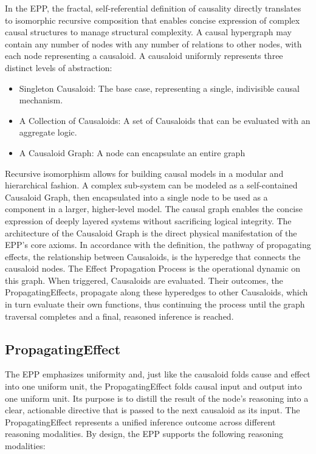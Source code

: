 In the EPP, the fractal, self-referential definition of causality directly translates 
to isomorphic recursive composition that enables concise expression of complex causal structures to manage structural complexity. A causal hypergraph may contain any number of nodes with any number of relations to other nodes, with each node representing a causaloid. A causaloid uniformly represents three distinct levels of abstraction:

\begin{itemize}
 	\item Singleton Causaloid: The base case, representing a single, indivisible causal mechanism.
 	\item A Collection of Causaloids: A set of Causaloids that can be evaluated with an aggregate logic. 
 	\item A Causaloid Graph: A node can encapsulate an entire graph
\end{itemize}

Recursive isomorphism allows for building causal models in a modular and hierarchical fashion. 
A complex sub-system can be modeled as a self-contained Causaloid Graph, then encapsulated into a single node to be used as a component in a larger, higher-level model. The causal graph enables the concise expression of deeply layered systems without sacrificing logical integrity. The architecture of the Causaloid Graph is the direct physical manifestation of the EPP's core axioms. In accordance with the definition, the pathway of propagating effects, the relationship between Causaloids, is the hyperedge that connects the causaloid nodes. The Effect Propagation Process is the operational dynamic on this graph. When triggered, Causaloids are evaluated. Their outcomes, the PropagatingEffects, propagate along these hyperedges to other Causaloids, which in turn evaluate their own functions, thus continuing the process until the graph traversal completes and a final, reasoned inference is reached.

%
%
\subsection{PropagatingEffect}
\label{sec:propagating_effect}

The EPP emphasizes uniformity and, just like the causaloid folds cause and effect into one uniform unit, the PropagatingEffect folds causal input and output into one uniform unit. Its purpose is to distill the result of the node's reasoning into a clear, actionable directive that is passed to the next causaloid as its input. The PropagatingEffect represents a unified inference outcome across different reasoning modalities. By design, the EPP supports the following reasoning modalities:

